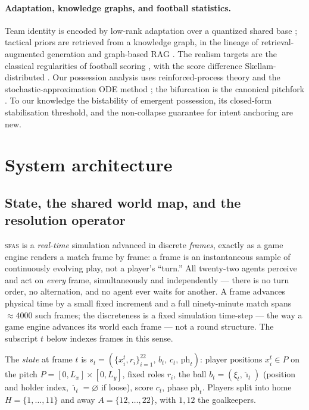\documentclass[11pt]{article}
\theoremstyle{definition}
\theoremstyle{remark}
\newcommand{\sfas}{\textsc{sfas}}
\begin{document}
\paragraph{Adaptation, knowledge graphs, and football statistics.} Team identity is encoded by low-rank adaptation \citep{hu2021} over a quantized shared base \citep{dettmers2023qlora}; tactical priors are retrieved from a knowledge graph, in the lineage of retrieval-augmented generation \citep{lewis2020} and graph-based RAG \citep{edge2024graphrag}. The realism targets are the classical regularities of football scoring \citep{maher1982,dixon1997}, with the score difference Skellam-distributed \citep{skellam1946}. Our possession analysis uses reinforced-process theory \citep{pemantle2007} and the stochastic-approximation ODE method \citep{benaim1999,kushner2003}; the bifurcation is the canonical pitchfork \citep{strogatz1994}. To our knowledge the bistability of emergent possession, its closed-form stabilisation threshold, and the non-collapse guarantee for intent anchoring are new.

\section{System architecture}\label{sec:arch}

\subsection{State, the shared world map, and the resolution operator}

\sfas{} is a \emph{real-time} simulation advanced in discrete \emph{frames}, exactly as a game engine renders a match frame by frame: a frame is an instantaneous sample of continuously evolving play, not a player's ``turn.'' All twenty-two agents perceive and act on \emph{every} frame, simultaneously and independently --- there is no turn order, no alternation, and no agent ever waits for another. A frame advances physical time by a small fixed increment and a full ninety-minute match spans $\approx4000$ such frames; the discreteness is a fixed simulation time-step --- the way a game engine advances its world each frame --- not a round structure. The subscript $t$ below indexes frames in this sense.

The \emph{state} at frame $t$ is $s_t=(\{x_i^t,r_i\}_{i=1}^{22},\,b_t,\,c_t,\,\text{ph}_t)$: player positions $x_i^t\in P$ on the pitch $P=[0,L_x]\times[0,L_y]$, fixed roles $r_i$, the ball $b_t=(\xi_t,\hat\imath_t)$ (position and holder index, $\hat\imath_t=\varnothing$ if loose), score $c_t$, phase $\text{ph}_t$. Players split into home $H=\{1,\dots,11\}$ and away $A=\{12,\dots,22\}$, with $1,12$ the goalkeepers.
\end{document}
